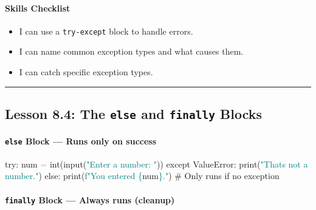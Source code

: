\documentclass[
  justified,
  openright,
]{tufte-book}
\let\subsubsection\paragraph
\let\paragraph\paragraph
\newcommand{\BuiltInTok}[1]{#1}
\newcommand{\CommentTok}[1]{\textcolor{MidGray}{#1}}
\newcommand{\ControlFlowTok}[1]{\textcolor{BrandBlue}{#1}}
\newcommand{\NormalTok}[1]{#1}
\newcommand{\OperatorTok}[1]{\textcolor{DarkGray}{#1}}
\newcommand{\PreprocessorTok}[1]{\textcolor{BrandAccent}{#1}}
\newcommand{\SpecialCharTok}[1]{\textcolor{Teal}{#1}}
\newcommand{\SpecialStringTok}[1]{\textcolor{Teal}{#1}}
\newcommand{\StringTok}[1]{\textcolor{Teal}{#1}}
\newenvironment{Shaded}{%
  \begin{snugshade}
}{%
  \end{snugshade}
}
\let\subsubsection\paragraph
\let\paragraph\paragraph
\providecommand{\tightlist}{%
  \setlength{\itemsep}{0pt}\setlength{\parskip}{0pt}}
\begin{document}
\subsubsection{Skills Checklist}\label{skills-checklist-39}

\begin{itemize}
\tightlist
\item[$\square$]
  I can use a \texttt{try-except} block to handle errors.
\item[$\square$]
  I can name common exception types and what causes them.
\item[$\square$]
  I can catch specific exception types.
\end{itemize}

\begin{center}\rule{0.5\linewidth}{0.5pt}\end{center}

\subsection{\texorpdfstring{Lesson 8.4: The \texttt{else} and
\texttt{finally}
Blocks}{Lesson 8.4: The else and finally Blocks}}\label{lesson-8.4-the-else-and-finally-blocks}

\subsubsection{\texorpdfstring{\texttt{else} Block --- Runs only on
success}{else Block --- Runs only on success}}\label{else-block-runs-only-on-success}

\begin{Shaded}
\begin{Highlighting}[]
\ControlFlowTok{try}\NormalTok{:}
\NormalTok{    num }\OperatorTok{=} \BuiltInTok{int}\NormalTok{(}\BuiltInTok{input}\NormalTok{(}\StringTok{"Enter a number: "}\NormalTok{))}
\ControlFlowTok{except} \PreprocessorTok{ValueError}\NormalTok{:}
    \BuiltInTok{print}\NormalTok{(}\StringTok{"That\textquotesingle{}s not a number."}\NormalTok{)}
\ControlFlowTok{else}\NormalTok{:}
    \BuiltInTok{print}\NormalTok{(}\SpecialStringTok{f"You entered }\SpecialCharTok{\{}\NormalTok{num}\SpecialCharTok{\}}\SpecialStringTok{."}\NormalTok{)   }\CommentTok{\# Only runs if no exception}
\end{Highlighting}
\end{Shaded}

\subsubsection{\texorpdfstring{\texttt{finally} Block --- Always runs
(cleanup)}{finally Block --- Always runs (cleanup)}}\label{finally-block-always-runs-cleanup}
\end{document}

